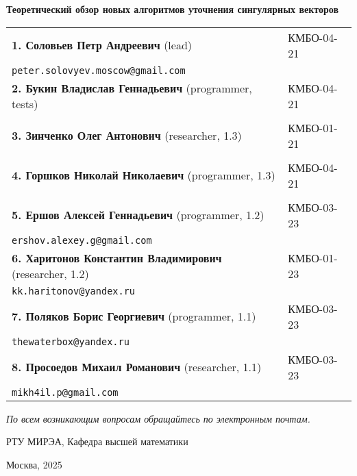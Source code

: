 \documentclass[12pt, a4paper]{report}
\begin{document}
\begin{titlepage}
  \centering
  \vspace*{1cm}
  
  {\LARGE\bfseries Теоретический обзор новых алгоритмов уточнения сингулярных векторов\par}
  \vspace{2cm}

  \begin{minipage}{0.9\textwidth}
    \centering
    \begin{tabular}{p{12cm}l}
      \textbf{1. Соловьев Петр Андреевич} (lead) & КМБО-04-21 \\
      \hspace{1.5cm} \texttt{peter.solovyev.moscow@gmail.com} \\
      \textbf{2. Букин Владислав Геннадьевич} (programmer, tests) & КМБО-04-21 \\
      \\
      \textbf{3. Зинченко Олег Антонович} (researcher, 1.3) & КМБО-01-21 \\
      \\
      \textbf{4. Горшков Николай Николаевич} (programmer, 1.3) & КМБО-04-21 \\
      \\
      \textbf{5. Ершов Алексей Геннадьевич} (programmer, 1.2) & КМБО-03-23 \\
      \hspace{1.5cm} \texttt{ershov.alexey.g@gmail.com} \\
      \textbf{6. Харитонов Константин Владимирович} (researcher, 1.2) & КМБО-01-23 \\
      \hspace{1.5cm} \texttt{kk.haritonov@yandex.ru} \\
      \textbf{7. Поляков Борис Георгиевич} (programmer, 1.1) & КМБО-03-23 \\
      \hspace{1.5cm} \texttt{thewaterbox@yandex.ru} \\
      \textbf{8. Просоедов Михаил Романович} (researcher, 1.1) & КМБО-03-23 \\
      \hspace{1.5cm} \texttt{mikh4il.p@gmail.com} \\
    \end{tabular}
  \end{minipage}
  
  \vspace{1cm} %
  
  \begin{minipage}{0.8\textwidth}
    \centering
    \textit{По всем возникающим вопросам обращайтесь по электронным почтам.} 
  \end{minipage}
  
  \vfill %

  {\large РТУ МИРЭА, Кафедра высшей математики\par}
  {\large Москва, 2025\par}
\end{titlepage}
\end{document}
